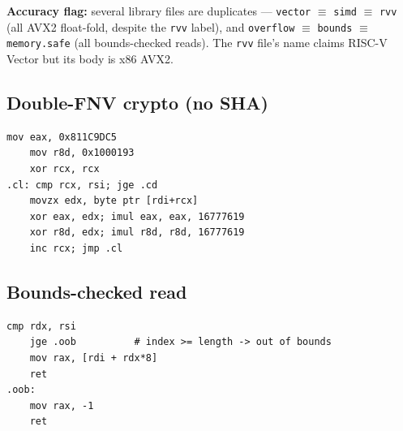 \noindent \textbf{Accuracy flag:} several library files are duplicates ---
\texttt{vector} $\equiv$ \texttt{simd} $\equiv$ \texttt{rvv} (all AVX2
float-fold, despite the \texttt{rvv} label), and
\texttt{overflow} $\equiv$ \texttt{bounds} $\equiv$ \texttt{memory.safe}
(all bounds-checked reads).  The \texttt{rvv} file's name claims RISC-V
Vector but its body is x86 AVX2.

\subsection{Double-FNV crypto (no SHA)}

\begin{lstlisting}[language=SakumAsm,caption={Double-FNV-1a (sakum\_lib\_crypto.s:8).}]
    mov eax, 0x811C9DC5
    mov r8d, 0x1000193
    xor rcx, rcx
.cl: cmp rcx, rsi; jge .cd
    movzx edx, byte ptr [rdi+rcx]
    xor eax, edx; imul eax, eax, 16777619
    xor r8d, edx; imul r8d, r8d, 16777619
    inc rcx; jmp .cl
\end{lstlisting}

\subsection{Bounds-checked read}

\begin{lstlisting}[language=SakumAsm,caption={Bounds check (sakum\_lib\_bounds.s:6).}]
    cmp rdx, rsi
    jge .oob          # index >= length -> out of bounds
    mov rax, [rdi + rdx*8]
    ret
.oob:
    mov rax, -1
    ret
\end{lstlisting}
